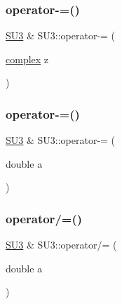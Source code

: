 \mbox{\label{class_s_u3_ab86d0576a1029b0ae58fea437c4606aa}} 
\subsubsection{\texorpdfstring{operator-\/=()}{operator-=()}\hspace{0.1cm}{\footnotesize\ttfamily [2/3]}}
{\footnotesize\ttfamily \mbox{\hyperlink{class_s_u3}{S\+U3}} \& S\+U3\+::operator-\/= (\begin{DoxyParamCaption}\item[{\mbox{\hyperlink{classcomplex}{complex}}}]{z }\end{DoxyParamCaption})\hspace{0.3cm}{\ttfamily [inline]}}

\mbox{\label{class_s_u3_aaa29d14e952a9b9fcacad15f4a34c6d6}} 
\subsubsection{\texorpdfstring{operator-\/=()}{operator-=()}\hspace{0.1cm}{\footnotesize\ttfamily [3/3]}}
{\footnotesize\ttfamily \mbox{\hyperlink{class_s_u3}{S\+U3}} \& S\+U3\+::operator-\/= (\begin{DoxyParamCaption}\item[{double}]{a }\end{DoxyParamCaption})\hspace{0.3cm}{\ttfamily [inline]}}

\mbox{\label{class_s_u3_a9b49b10ffea08d20b5a89409501ef7d5}} 
\subsubsection{\texorpdfstring{operator/=()}{operator/=()}}
{\footnotesize\ttfamily \mbox{\hyperlink{class_s_u3}{S\+U3}} \& S\+U3\+::operator/= (\begin{DoxyParamCaption}\item[{double}]{a }\end{DoxyParamCaption})\hspace{0.3cm}{\ttfamily [inline]}}

